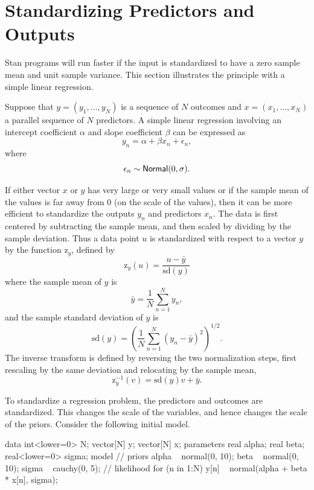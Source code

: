 \section{Standardizing Predictors and Outputs}

Stan programs will run faster if the input is standardized to have a
zero sample mean and unit sample variance.  This section illustrates
the principle with a simple linear regression.

Suppose that $y = (y_1,\ldots,y_N)$ is a sequence of $N$ outcomes and
$x = (x_1,\ldots,x_N)$ a parallel sequence of $N$ predictors.  A
simple linear regression involving an intercept coefficient $\alpha$
and slope coefficient $\beta$ can be expressed as
\[
y_n = \alpha + \beta x_n + \epsilon_n,
\]
where
\[
\epsilon_n \sim \mbox{\sf Normal}(0,\sigma).
\]

If either vector $x$ or $y$ has very large or very small values or if the
sample mean of the values is far away from 0 (on the scale of the values),
then it can be more efficient to standardize the outputs $y_n$ and
predictors $x_n$.  The data is first centered by subtracting the
sample mean, and then scaled by dividing by the sample deviation.
Thus a data point $u$ is standardized with respect to
a vector $y$  by the function $\mbox{z}_y$, defined by
\[
\mbox{z}_y(u) = \frac{u - \bar{y}}{\mbox{sd}(y)}
\]
where the sample mean of $y$ is
\[
\bar{y}
= \frac{1}{N} \sum_{n=1}^N y_n,
\]
and the sample standard deviation of $y$ is
\[
\mbox{sd}(y)
= \left(
\frac{1}{N} \sum_{n=1}^N (y_n - \bar{y})^2
\right)^{1/2}.
\]
The inverse transform is
defined by reversing the two normalization steps, first rescaling by
the same deviation and relocating by the sample mean,
\[
\mbox{z}_y^{-1}(v) = \mbox{sd}(y) v + \bar{y}.
\]

To standardize a regression problem, the predictors and outcomes are
standardized.  This changes the scale of the variables, and hence
changes the scale of the priors.  Consider the following initial
model.
%
\begin{stancode}
data {
  int<lower=0> N;
  vector[N] y;
  vector[N] x;
}
parameters {
  real alpha;
  real beta;
  real<lower=0> sigma;
}
model {
  // priors
  alpha ~ normal(0, 10);
  beta ~ normal(0, 10);
  sigma ~ cauchy(0, 5);
  // likelihood
  for (n in 1:N)
    y[n] ~ normal(alpha + beta * x[n], sigma);
}
\end{stancode}
%

